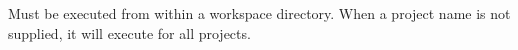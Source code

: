 Must be executed from within a workspace directory. When a project name is not supplied, it will execute for all projects. 